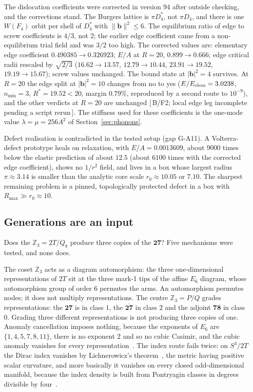 \documentclass[a4paper,11pt]{article}
\numberwithin{equation}{section}
\theoremstyle{jsplain}
\theoremstyle{jsrem}
\newcommand{\grade}[1]{[\,#1\,]}
\begin{document}
The dislocation coefficients were corrected in version 94 after outside checking, and the corrections stand. The Burgers lattice is $\pi D_4^*$, not $\pi D_4$, and there is one $W(F_4)$ orbit per shell of $D_4^*$ with $\|\mathbf{b}\|^2\le6$. The equilibrium ratio of edge to screw coefficients is $4/3$, not $2$; the earlier edge coefficient came from a non-equilibrium trial field and was $3/2$ too high. The corrected values are: elementary edge coefficient $0.490385\to0.326923$; $E/A$ at $R=20$, $0.899\to0.666$; edge critical radii rescaled by $\sqrt{2/3}$ ($16.62\to13.57$, $12.79\to10.44$, $23.91\to19.52$, $19.19\to15.67$); screw values unchanged. The bound state at $|\mathbf{b}|^2=4$ survives. At $R=20$ the edge split at $|\mathbf{b}|^2=10$ changes from no to yes ($E/E_{\rm elem}=3.0238$, $n_{\min}=3$, $R^*=19.52<20$, margin $0.79\%$, reproduced by a second route to $10^{-9}$), and the other verdicts at $R=20$ are unchanged \grade{B/F2; local edge leg incomplete pending a script rerun}. The stiffness used for these coefficients is the one-mode value $\lambda=\mu=256A^2$ of Section~\ref{sec:phonons}.

Defect realisation is contradicted in the tested setup (gap G-A11). A Volterra-defect prototype heals on relaxation, with $E/A=0.0013609$, about $9000$ times below the elastic prediction of about $12.5$ (about $6100$ times with the corrected edge coefficient), shows no $1/r^2$ field, and lives in a box whose largest radius $\pi\approx3.14$ is smaller than the analytic core scale $r_0\approx10.05$ or $7.10$. The sharpest remaining problem is a pinned, topologically protected defect in a box with $R_{\max}\gg r_0\approx10$.

\subsection{Generations are an input}

Does the $\mathbb{Z}_3=2T/Q_8$ produce three copies of the $\mathbf{27}$? Five mechanisms were tested, and none does.

The coset $\mathbb{Z}_3$ acts as a diagram automorphism: the three one-dimensional representations of $2T$ sit at the three mark-1 tips of the affine $E_6$ diagram, whose automorphism group of order $6$ permutes the arms. An automorphism permutes nodes; it does not multiply representations. The centre $\mathbb{Z}_3=P/Q$ grades representations: the $\mathbf{27}$ is in class $1$, the $\overline{\mathbf{27}}$ in class $2$ and the adjoint $\mathbf{78}$ in class $0$. Grading three different representations is not producing three copies of one. Anomaly cancellation imposes nothing, because the exponents of $E_6$ are $\{1,4,5,7,8,11\}$, there is no exponent $2$ and so no cubic Casimir, and the cubic anomaly vanishes for every representation~\cite{ref29}. The index route fails twice: on $S^3/2T$ the Dirac index vanishes by Lichnerowicz's theorem~\cite{ref31}, the metric having positive scalar curvature, and more basically it vanishes on every closed odd-dimensional manifold, because the index density is built from Pontryagin classes in degrees divisible by four~\cite{ref32}.
\end{document}

